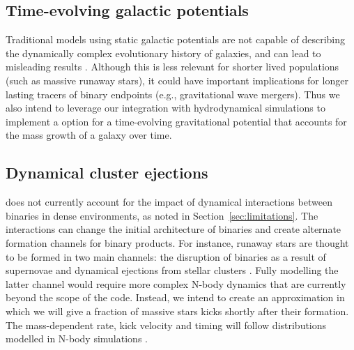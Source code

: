 \documentclass[twocolumn, twocolappendix, oneside]{aastex631}
\begin{document}
\subsection{Time-evolving galactic potentials}\label{sec:time-evolving-potentials}
Traditional models using static galactic potentials are not capable of describing the dynamically complex evolutionary history of galaxies, and can lead to misleading results \citep[e.g.,][]{Arora+2022}. Although this is less relevant for shorter lived populations (such as massive runaway stars), it could have important implications for longer lasting tracers of binary endpoints (e.g., gravitational wave mergers). Thus we also intend to leverage our integration with hydrodynamical simulations to implement a \cogsworth option for a time-evolving gravitational potential that accounts for the mass growth of a galaxy over time.

\subsection{Dynamical cluster ejections}\label{sec:cluster_ejections}

\cogsworth does not currently account for the impact of dynamical interactions between binaries in dense environments, as noted in Section~\ref{sec:limitations}. The interactions can change the initial architecture of binaries \citep[e.g.,][]{Fujii+2011:2011Sci...334.1380F} and create alternate formation channels for binary products. For instance, runaway stars are thought to be formed in two main channels: the disruption of binaries as a result of supernovae \citep{Blaauw+1961, Eldridge+2011:2011MNRAS.414.3501E, Renzo+2019:2019A&A...624A..66R} and dynamical ejections from stellar clusters \citep{Poveda+1967}. Fully modelling the latter channel would require more complex N-body dynamics that are currently beyond the scope of the code. Instead, we intend to create an approximation in which we will give a fraction of massive stars kicks shortly after their formation. The mass-dependent rate, kick velocity and timing will follow distributions modelled in N-body simulations \cite[e.g.,][]{Oh+2016:2016A&A...590A.107O, Schoettler+2022:2022MNRAS.510.3178S}.
\end{document}
